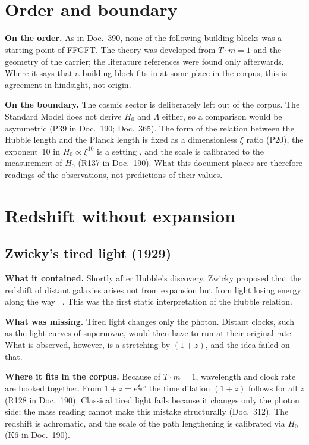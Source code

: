 \section{Order and boundary}

\textbf{On the order.} As in Doc.~390, none of the following building blocks was a starting point of
FFGFT. The theory was developed from $\tilde T\cdot m=1$ and the geometry of the carrier; the
literature references were found only afterwards. Where it says that a building block fits in at
some place in the corpus, this is agreement in hindsight, not origin.

\textbf{On the boundary.} The cosmic sector is deliberately left out of the corpus. The Standard
Model does not derive $H_0$ and $\Lambda$ either, so a comparison would be asymmetric (P39 in
Doc.~190; Doc.~365). The form of the relation between the Hubble length and the Planck length is
fixed as a dimensionless $\xi$ ratio (P20), the exponent~10 in $H_0\propto\xi^{10}$ is a setting
\SetzM, and the scale is calibrated to the measurement of $H_0$ (R137 in Doc.~190). What this
document places are therefore readings of the observations, not predictions of their values.

\section{Redshift without expansion}

\subsection{Zwicky's tired light (1929)}

\textbf{What it contained.} Shortly after Hubble's discovery, Zwicky proposed that the redshift of
distant galaxies arises not from expansion but from light losing energy along the way
\QM~\cite{Zwicky1929}. This was the first static interpretation of the Hubble relation.

\textbf{What was missing.} Tired light changes only the photon. Distant clocks, such as the light
curves of supernovae, would then have to run at their original rate. What is observed, however, is
a stretching by $(1+z)$, and the idea failed on that.

\textbf{Where it fits in the corpus.} Because of $\tilde T\cdot m=1$, wavelength and clock rate are
booked together. From $1+z=e^{\xi_0 x}$ the time dilation $(1+z)$ follows for all $z$ \BM{} (R128 in
Doc.~190). Classical tired light fails because it changes only the photon side; the mass reading
cannot make this mistake structurally (Doc.~312). The redshift is achromatic, and the scale of the
path lengthening is calibrated via $H_0$ (K6 in Doc.~190).

